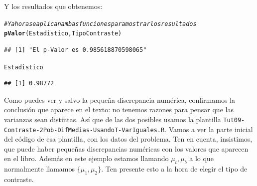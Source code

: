\documentclass[10pt,a4paper]{article}\usepackage[]{graphicx}\usepackage[]{color}
\makeatletter
\newcommand{\hlcom}[1]{\textcolor[rgb]{0.678,0.584,0.686}{\textit{#1}}}%
\newcommand{\hlstd}[1]{\textcolor[rgb]{0.345,0.345,0.345}{#1}}%
\newcommand{\hlkwd}[1]{\textcolor[rgb]{0.737,0.353,0.396}{\textbf{#1}}}%
\newenvironment{kframe}{%
 \def\at@end@of@kframe{}%
 \ifinner\ifhmode%
  \def\at@end@of@kframe{\end{minipage}}%
  \begin{minipage}{\columnwidth}%
 \fi\fi%
 \def\FrameCommand##1{\hskip\@totalleftmargin \hskip-\fboxsep
 \colorbox{shadecolor}{##1}\hskip-\fboxsep
     \hskip-\linewidth \hskip-\@totalleftmargin \hskip\columnwidth}%
 \MakeFramed {\advance\hsize-\width
   \@totalleftmargin\z@ \linewidth\hsize
   \@setminipage}}%
 {\par\unskip\endMakeFramed%
 \at@end@of@kframe}
\newenvironment{knitrout}{}{} %
\newcounter {cont01}
\makeatother
\begin{document}
Y los resultados que obtenemos:
\begin{knitrout}
\color{fgcolor}\begin{kframe}
\begin{alltt}
 \hlcom{# Y ahora se aplican ambas funciones para mostrar los resultados}
     \hlkwd{pValor}\hlstd{(Estadistico,TipoContraste)}
\end{alltt}
\begin{verbatim}
## [1] "El p-Valor es 0.985618870598065"
\end{verbatim}
\begin{alltt}
     \hlstd{Estadistico}
\end{alltt}
\begin{verbatim}
## [1] 0.98772
\end{verbatim}
\end{kframe}
\end{knitrout}
Como puedes ver y salvo la pequeña discrepancia numérica, confirmamos  la conclusión que aparece en el texto: no tenemos razones para pensar que las varianzas sean distintas. Así que de las dos posibles usamos la plantilla {\tt Tut09-Contraste-2Pob-DifMedias-UsandoT-VarIguales.R}. Vamos a ver la parte inicial del código de esa plantilla, con los datos del problema. Ten en cuenta, insistimos, que puede haber pequeñas discrepancias numéricas con los valores que aparecen en el libro. Además en este ejemplo estamos llamando $\mu_t, \mu_b$ a lo que normalmente llamamos $\{\mu_1, \mu_2\}$. Ten presente esto a la hora de elegir el tipo de contraste.
\end{document}
